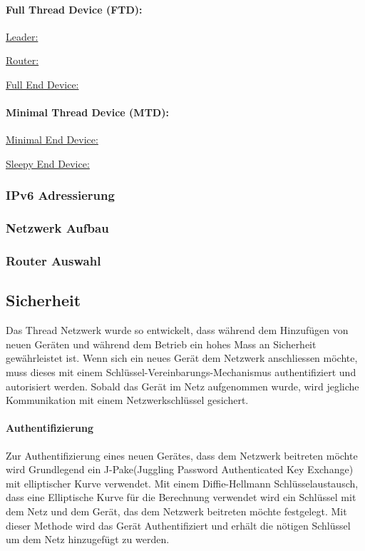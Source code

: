 \paragraph{Full Thread Device (FTD):}\label{par:FullThreadDevice}

\underline{Leader:}

\underline{Router:}

\underline{Full End Device:}

\paragraph{Minimal Thread Device (MTD): }

\underline{Minimal End Device:}

\underline{Sleepy End Device:}

\subsubsection{IPv6 Adressierung}\label{subsubsec:IPv6Adressierung}

\subsubsection{Netzwerk Aufbau}\label{subsubsec:NetzwerkAufbau}

\subsubsection{Router Auswahl}\label{subsubsec:RouterAuswahl}
\newpage

\subsection{Sicherheit}\label{subsec:Sicherheit}
Das Thread Netzwerk wurde so entwickelt, dass während dem Hinzufügen von neuen Geräten und während dem Betrieb ein hohes Mass an Sicherheit gewährleistet ist. Wenn sich ein neues Gerät dem Netzwerk anschliessen möchte, muss dieses mit einem Schlüssel-Vereinbarungs-Mechanismus authentifiziert und autorisiert werden. Sobald das Gerät im Netz aufgenommen wurde, wird jegliche Kommunikation mit einem Netzwerkschlüssel gesichert.

\paragraph{Authentifizierung}
Zur Authentifizierung eines neuen Gerätes, dass dem Netzwerk beitreten möchte wird Grundlegend ein J-Pake(Juggling Password Authenticated Key Exchange) mit elliptischer Kurve verwendet. Mit einem Diffie-Hellmann Schlüsselaustausch, dass eine Elliptische Kurve für die Berechnung verwendet wird ein Schlüssel mit dem Netz und dem Gerät, das dem Netzwerk beitreten möchte festgelegt. Mit dieser Methode wird das Gerät Authentifiziert und erhält die nötigen Schlüssel um dem Netz hinzugefügt zu werden. \cite[Seite 1-4]{thread_group_inc_thread_2017}

